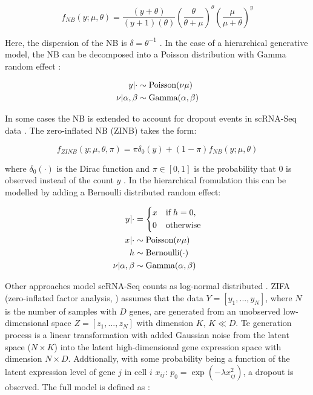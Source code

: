 \begin{equation}
f_{NB}(y;\mu,\theta)=\frac{(y+\theta)}{(y+1)(\theta)}\left(\frac{\theta}{\theta + \mu}\right)^\theta\left(\frac{\mu}{\mu + \theta}\right)^y
\end{equation}

Here, the dispersion of the NB is $\delta=\theta^{-1}$ \cite{Risso2018}. In the case of a hierarchical generative model, the NB can be decomposed into a Poisson distribution with Gamma random effect \cite{Vallejos2015BASiCS}:

\begin{align*}
y|\cdot&\sim{}\textnormal{Poisson}(\nu\mu)\\
\nu|\alpha,\beta&\sim{}\textnormal{Gamma}(\alpha,\beta)
\end{align*}

In some cases \citep{Risso2018, Lopez2018} the NB is extended to account for dropout events in scRNA-Seq data \citep{Kharchenko2015}. The zero-inflated NB (ZINB) takes the form:

\begin{equation}
f_{ZINB}(y;\mu,\theta,\pi)=\pi\delta_0(y) + (1-\pi)f_{NB}(y;\mu,\theta) 
\end{equation}

where $\delta_0(\cdot)$ is the Dirac function and $\pi\in[0,1]$ is the probability that 0 is observed instead of the count $y$ \citep{Risso2018}. In the hierarchical fromulation this can be modelled by adding a Bernoulli distributed random effect:

\begin{align*}
y|\cdot & = 
 \left\lbrace
  \begin{aligned}
    & x && \textnormal{if} \; h = 0,  \\ 
    & 0 && \textnormal{otherwise}    	    
  \end{aligned}
\right.\\
x|\cdot&\sim{}\textnormal{Poisson}(\nu\mu)\\
h & \sim \textnormal{Bernoulli}(\cdot)\\
\nu|\alpha,\beta&\sim{}\textnormal{Gamma}(\alpha,\beta)
\end{align*}

Other approaches model scRNA-Seq counts as log-normal distributed \citep{Azizi2017,Pierson2015}. ZIFA (zero-inflated factor analysis, \citep{Pierson2015}) assumes that the data $Y=[y_1,...,y_N]$, where $N$ is the number of samples with $D$ genes, are generated from an unobserved low-dimensional space $Z=[z_1,...,z_N]$ with dimension $K,\,{}K\ll{}D$. Te generation process is a linear transformation with added Gaussian noise from the latent space ($N\times{}K$) into the latent high-dimensional gene expression space with dimension $N\times{}D$. Addtionally, with some probability being a function of the latent expression level of gene $j$ in cell $i$ $x_{ij}$: $p_0=\exp(-\lambda{}x_{ij}^2)$, a dropout is observed. The full model is defined as \citep{Pierson2015}:

